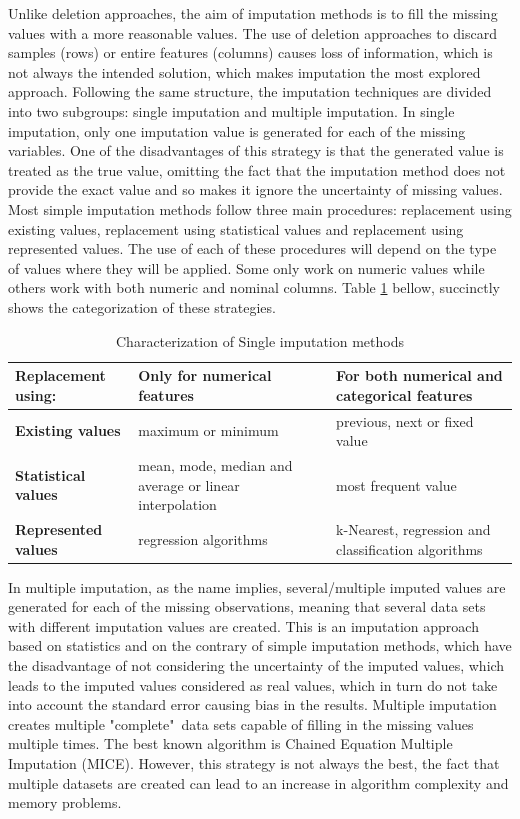 Unlike deletion approaches, the aim of imputation methods is to fill the missing values with a more reasonable values. The use of deletion approaches to discard samples (rows) or entire features (columns) causes loss of information, which is not always the intended solution, which makes imputation the most explored approach. Following the same structure, the imputation techniques are divided into two subgroups: single imputation and multiple imputation. In single imputation, only one imputation value is generated for each of the missing variables. One of the disadvantages of this strategy is that the generated value is treated as the true value, omitting the fact that the imputation method does not provide the exact value and so makes it ignore the uncertainty of missing values. Most simple imputation methods follow three main procedures: replacement using existing values, replacement using statistical values and replacement using represented values. The use of each of these procedures will depend on the type of values where they will be applied. Some only work on numeric values while others work with both numeric and nominal columns. Table \ref{table:1} bellow, succinctly shows the categorization of these strategies.

\begin{table}[h!]
\centering
\begin{center}
\begin{tabular}{ | m{5.5em} | m{5cm}| m{5cm} | } 
 \hline
 \textbf{Replacement using:} & \textbf{Only for numerical features} & \textbf{For both numerical and categorical features} \\ 
 \hline
 \textbf{Existing values} & maximum or minimum  & previous,  next or fixed value\\
 \hline
 \textbf{Statistical values} & mean, mode, median and average or linear interpolation & most frequent value\\
 \hline
  \textbf{Represented values} & regression algorithms & k-Nearest, regression and classification algorithms \\ 
 \hline
\end{tabular}
\caption{Characterization of Single imputation methods}
\label{table:1}
\end{center}
\end{table}

In multiple imputation, as the name implies, several/multiple imputed values are generated for each of the missing observations, meaning that several data sets with different imputation values are created. This is an imputation approach based on statistics and on the contrary of simple imputation methods, which have the disadvantage of not considering the uncertainty of the imputed values, which leads to the imputed values considered as real values, which in turn do not take into account the standard error causing bias in the results\cite{Azur}. Multiple imputation creates multiple "complete"\ data sets capable of filling in the missing values multiple times. The best known algorithm is Chained Equation Multiple Imputation (MICE). However, this strategy is not always the best, the fact that multiple datasets are created can lead to an increase in algorithm complexity and memory problems.

